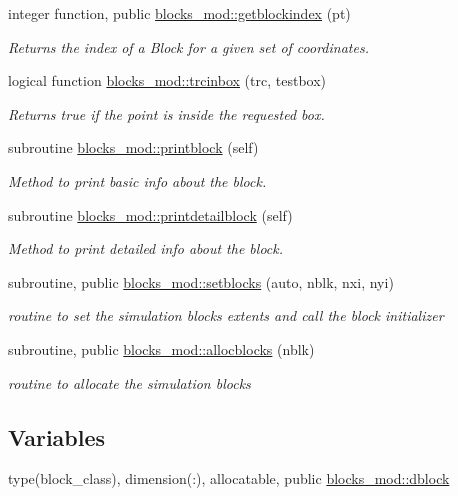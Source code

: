 \begin{DoxyCompactItemize}
integer function, public \mbox{\hyperlink{namespaceblocks__mod_a62e8fb0d6b2535b4499c7a4d848c24ba}{blocks\+\_\+mod\+::getblockindex}} (pt)
\begin{DoxyCompactList}\small\item\em Returns the index of a Block for a given set of coordinates. \end{DoxyCompactList}\item 
logical function \mbox{\hyperlink{namespaceblocks__mod_ad8d92210b3d4ade090d2a19b97f4c88e}{blocks\+\_\+mod\+::trcinbox}} (trc, testbox)
\begin{DoxyCompactList}\small\item\em Returns true if the point is inside the requested box. \end{DoxyCompactList}\item 
subroutine \mbox{\hyperlink{namespaceblocks__mod_a6eab8b323cb15dcecb5c6b0c31b4e246}{blocks\+\_\+mod\+::printblock}} (self)
\begin{DoxyCompactList}\small\item\em Method to print basic info about the block. \end{DoxyCompactList}\item 
subroutine \mbox{\hyperlink{namespaceblocks__mod_a10f356706988c45a255922fe70851488}{blocks\+\_\+mod\+::printdetailblock}} (self)
\begin{DoxyCompactList}\small\item\em Method to print detailed info about the block. \end{DoxyCompactList}\item 
subroutine, public \mbox{\hyperlink{namespaceblocks__mod_a8f5a5d9e6cfd16cfd1b179092a204696}{blocks\+\_\+mod\+::setblocks}} (auto, nblk, nxi, nyi)
\begin{DoxyCompactList}\small\item\em routine to set the simulation blocks extents and call the block initializer \end{DoxyCompactList}\item 
subroutine, public \mbox{\hyperlink{namespaceblocks__mod_a639beb0fee2290d46353f4b4702d6711}{blocks\+\_\+mod\+::allocblocks}} (nblk)
\begin{DoxyCompactList}\small\item\em routine to allocate the simulation blocks \end{DoxyCompactList}\end{DoxyCompactItemize}
\subsection*{Variables}
\begin{DoxyCompactItemize}
\item 
type(block\+\_\+class), dimension(\+:), allocatable, public \mbox{\hyperlink{namespaceblocks__mod_ac8ad6e3cf7a812f95dadb592336aca50}{blocks\+\_\+mod\+::dblock}}
\end{DoxyCompactItemize}
